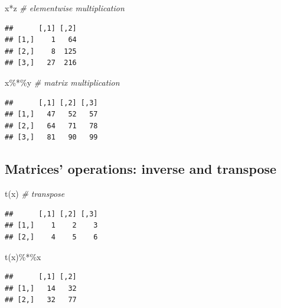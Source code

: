 \documentclass[
  11pt,
]{book}
\newenvironment{Shaded}{\begin{snugshade}}{\end{snugshade}}
\newcommand{\CommentTok}[1]{\textcolor[rgb]{0.56,0.35,0.01}{\textit{#1}}}
\newcommand{\FunctionTok}[1]{\textcolor[rgb]{0.00,0.00,0.00}{#1}}
\newcommand{\NormalTok}[1]{#1}
\newcommand{\SpecialCharTok}[1]{\textcolor[rgb]{0.00,0.00,0.00}{#1}}
\begin{document}
\begin{Shaded}
\begin{Highlighting}[]
\NormalTok{x}\SpecialCharTok{*}\NormalTok{z   }\CommentTok{\# elementwise multiplication}
\end{Highlighting}
\end{Shaded}

\begin{verbatim}
##      [,1] [,2]
## [1,]    1   64
## [2,]    8  125
## [3,]   27  216
\end{verbatim}

\begin{Shaded}
\begin{Highlighting}[]
\NormalTok{x}\SpecialCharTok{\%*\%}\NormalTok{y }\CommentTok{\# matrix multiplication}
\end{Highlighting}
\end{Shaded}

\begin{verbatim}
##      [,1] [,2] [,3]
## [1,]   47   52   57
## [2,]   64   71   78
## [3,]   81   90   99
\end{verbatim}

\hypertarget{matrices-operations-inverse-and-transpose}{%
\subsection{Matrices' operations: inverse and transpose}\label{matrices-operations-inverse-and-transpose}}

\begin{Shaded}
\begin{Highlighting}[]
\FunctionTok{t}\NormalTok{(x) }\CommentTok{\# transpose}
\end{Highlighting}
\end{Shaded}

\begin{verbatim}
##      [,1] [,2] [,3]
## [1,]    1    2    3
## [2,]    4    5    6
\end{verbatim}

\begin{Shaded}
\begin{Highlighting}[]
\FunctionTok{t}\NormalTok{(x)}\SpecialCharTok{\%*\%}\NormalTok{x}
\end{Highlighting}
\end{Shaded}

\begin{verbatim}
##      [,1] [,2]
## [1,]   14   32
## [2,]   32   77
\end{verbatim}
\end{document}
